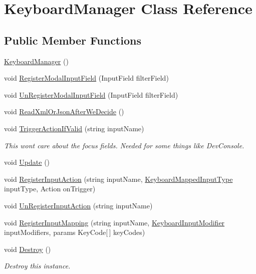 \hypertarget{class_keyboard_manager}{}\section{Keyboard\+Manager Class Reference}
\label{class_keyboard_manager}
\subsection*{Public Member Functions}
\begin{DoxyCompactItemize}
\item 
\hyperlink{class_keyboard_manager_adb37ed218542d83894ccaa2108773da7}{Keyboard\+Manager} ()
\item 
void \hyperlink{class_keyboard_manager_a2393502e8ac109543e028bbbd3ed149c}{Register\+Modal\+Input\+Field} (Input\+Field filter\+Field)
\item 
void \hyperlink{class_keyboard_manager_a458b30dc7b22d0f068b9646c2db73063}{Un\+Register\+Modal\+Input\+Field} (Input\+Field filter\+Field)
\item 
void \hyperlink{class_keyboard_manager_a1e1c00f7abd67e4f784cb3ca8497f6de}{Read\+Xml\+Or\+Json\+After\+We\+Decide} ()
\item 
void \hyperlink{class_keyboard_manager_a9131b36109dcdfb02e7e5c93c523cbdf}{Trigger\+Action\+If\+Valid} (string input\+Name)
\begin{DoxyCompactList}\small\item\em This won\textquotesingle{}t care about the focus fields. Needed for some things like Dev\+Console. \end{DoxyCompactList}\item 
void \hyperlink{class_keyboard_manager_aa462926c6558f1939ed876f93c1ba777}{Update} ()
\item 
void \hyperlink{class_keyboard_manager_a5981403c950a8151472aecc921d2fcb5}{Register\+Input\+Action} (string input\+Name, \hyperlink{_keyboard_mapped_input_type_8cs_ae342fcbcca71b2c821363b14ed799463}{Keyboard\+Mapped\+Input\+Type} input\+Type, Action on\+Trigger)
\item 
void \hyperlink{class_keyboard_manager_a797f31873324867559c3aabf66e91fdd}{Un\+Register\+Input\+Action} (string input\+Name)
\item 
void \hyperlink{class_keyboard_manager_a6fec4daf08361b0f51fe7f45a60dfcf3}{Register\+Input\+Mapping} (string input\+Name, \hyperlink{_keyboard_input_modifier_8cs_a45c5fbd3fc0bd2cbe0f27f511d6b5955}{Keyboard\+Input\+Modifier} input\+Modifiers, params Key\+Code\mbox{[}$\,$\mbox{]} key\+Codes)
\item 
void \hyperlink{class_keyboard_manager_abe76665b5a2c3ed850d6c7edb942656e}{Destroy} ()
\begin{DoxyCompactList}\small\item\em Destroy this instance. \end{DoxyCompactList}\end{DoxyCompactItemize}
